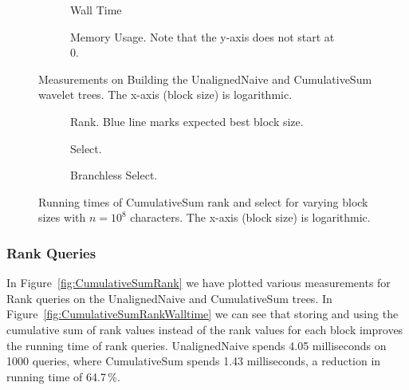 \begin{figure}\tiny
\begin{subfigure}{0.48\textwidth}
	
	\caption{Wall Time}
	\label{fig:CumulativeSumBuildWalltime}
\end{subfigure}
\hfill
\begin{subfigure}{0.48\textwidth}
	
	\caption{Memory Usage. Note that the y-axis does not start at 0.}
	\label{fig:CumulativeSumBuildMemoryUsage}
\end{subfigure}
\caption{Measurements on Building the UnalignedNaive and CumulativeSum wavelet trees. The x-axis (block size) is logarithmic.}
\label{fig:CumulativeSumBuild}
\vspace{5mm}
\begin{subfigure}{0.48\textwidth}
	
	\caption{Rank. Blue line marks expected best block size.}
	\label{fig:CumulativeSumBlockSizeWallTimeRank}
\end{subfigure}
\hfill
\begin{subfigure}{0.48\textwidth}
	
	\caption{Select.}
	\label{fig:CumulativeSumBlockSizeWallTimeSelect}
\end{subfigure}

\begin{subfigure}{0.48\textwidth}
	
	\caption{Branchless Select.}
	\label{fig:CumulativeSumBlockSizeWallTimeSelectBranchless}
\end{subfigure}

\caption{Running times of CumulativeSum rank and select for varying block sizes with $n=10^8$ characters. The x-axis (block size) is logarithmic.}
\label{fig:CumulativeSumBlockSize}
\end{figure}

\restoregeometry

\subsubsection{Rank Queries}
In Figure~\ref{fig:CumulativeSumRank} we have plotted various measurements for Rank queries on the UnalignedNaive and CumulativeSum trees.
In Figure~\ref{fig:CumulativeSumRankWalltime} we can see that storing and using the cumulative sum of rank values instead of the rank values for each block improves the running time of rank queries.
UnalignedNaive spends 4.05 milliseconds on 1000 queries, where CumulativeSum spends 1.43 milliseconds, a reduction in running time of 64.7\,\%.

